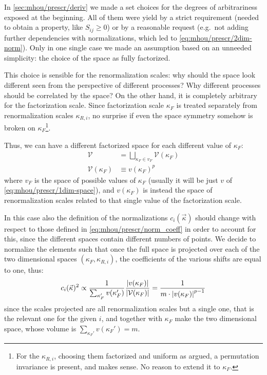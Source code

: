 In \cref{sec:mhou/prescr/deriv} we made a set choices for the degrees of
arbitrariness exposed at the beginning.
All of them were yield by a strict requirement (needed to obtain a property,
like $S_{ij} \ge 0$) or by a reasonable request (e.g.\ not adding further
dependencies with normalizations, which led to \cref{eq:mhou/prescr/2dim-norm}).
Only in one single case we made an assumption based on an unneeded simplicity:
the choice of the space as fully factorized.

This choice is sensible for the renormalization scales: why should the space
look different seen from the perspective of different processes? Why different
processes should be correlated by the space?
On the other hand, it is completely arbitrary for the factorization scale.
Since factorization scale $\kappa_F$ is treated separately from renormalization
scales $\kappa_{R,i}$, no surprise if even the space symmetry somehow is broken
on $\kappa_F$\footnote{
    For the $\kappa_{R,i}$, choosing them factorized and uniform as argued, a
    permutation invariance is present, and makes sense.
    No reason to extend it to $\kappa_F$.
}.

Thus, we can have a different factorized space for each different value of $\kappa_F$:
\begin{align}
    \label{eq:mhou/prescr/sliced-space}
    \mathcal{V} &= \bigsqcup_{\kappa_F \in v_F} \mathcal{V}(\kappa_F)\\
    \label{eq:mhou/prescr/1f-factorized}
    \mathcal{V}(\kappa_F) &\equiv v(\kappa_F)^p
\end{align}
where $v_F$ is the space of possible values of $\kappa_F$ (usually it will be
just $v$ of \cref{eq:mhou/prescr/1dim-space}), and $v(\kappa_F)$ is instead the space of
renormalization scales related to that single value of the factorization scale.

In this case also the definition of the normalizations $c_i(\vec{\kappa})$
should change with respect to those defined in \cref{eq:mhou/prescr/norm_coeff} in order to
account for this, since the different spaces contain different numbers of
points.
We decide to normalize the elements such that once the full space is projected
over each of the two dimensional spaces $(\kappa_F, \kappa_{R,i})$, the
coefficients of the various shifts are equal to one, thus:
\begin{equation}
    \label{eq:mhou/prescr/sliced-norm}
    c_i(\vec{\kappa})^2 \propto \frac{1}{\sum_{\kappa_F'}v(\kappa_F')} \frac{\abs{v(\kappa_F)}}{\abs{\mathcal{V}(\kappa_F)}}
        = \frac{1}{m \cdot \abs{v(\kappa_F)}^{p-1}}
\end{equation}
since the scales projected are all renormalization scales but a single one,
that is the relevant one for the given $i$, and together with $\kappa_F$ make
the two dimensional space, whose volume is $\sum_{\kappa_F'}v(\kappa_F') = m$.
